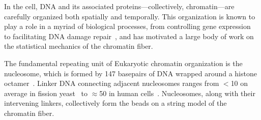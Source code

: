 \documentclass[%
 reprint,
superscriptaddress,
showpacs,preprintnumbers,
 amsmath,amssymb,
 aps,
 prl,
]{revtex4-1}
\begin{document}
\maketitle



In the cell, DNA and its associated proteins---collectively, chromatin---are
    carefully organized both spatially and temporally.
This organization is known to play a role in a myriad of biological processes,
    from controlling gene expression~\cite{hubner2013} to facilitating DNA
    damage repair~\cite{hauer2017,stadler2017}, and has motivated a large body
    of work on the statistical mechanics of the chromatin fiber.

The fundamental repeating unit of Eukaryotic chromatin organization is the
    nucleosome, which is formed by 147 basepairs of DNA wrapped around a histone
    octamer~\cite{cutter2015a}.
Linker DNA connecting adjacent nucleosomes ranges from $<$\SI{10}{\basepair} on
    average in fission yeast~\cite{givens2012} to {$\approx$\SI{50}{\basepair}} in human
    cells~\cite{schones2008}.
Nucleosomes, along with their intervening linkers, collectively form the
    beads on a string model of the chromatin fiber.
\end{document}
